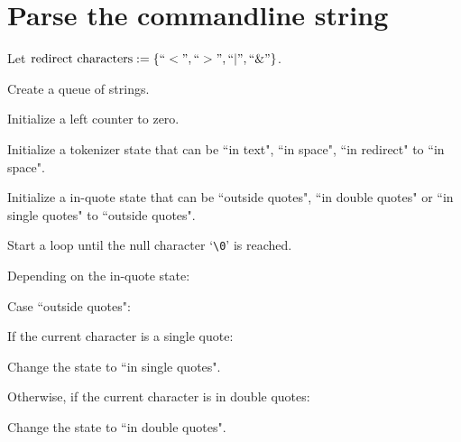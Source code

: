 \documentclass{article}
\begin{document}
\section{Parse the commandline string}
\begin{deepenum}
    \item
        Let \(\text{redirect characters} := \{``<", ``>", ``|", ``\&" \}\).
    \item
        Create a queue of strings.
    \item
        Initialize a left counter to zero.
    \item
        Initialize a tokenizer state that can be ``in text", ``in space", ``in redirect" to ``in space".
    \item
        Initialize a in-quote state that can be ``outside quotes", ``in double quotes" or ``in single quotes" to ``outside quotes".
    \item
        Start a loop until the null character `\texttt{\textbackslash0}' is reached.
        \begin{deepenum}
            \item
                Depending on the in-quote state:
                \begin{deepenum}
                    \item
                        Case ``outside quotes":
                        \begin{deepenum}
                            \item
                                If the current character is a single quote:
                                \begin{deepenum}
                                    \item
                                        Change the state to ``in single quotes".
                                \end{deepenum}
                            \item
                                Otherwise, if the current character is in double quotes:
                                \begin{deepenum}
                                    \item
                                        Change the state to ``in double quotes".
                                \end{deepenum}
                        \end{deepenum}
                    \item

\end{deepenum}
\end{deepenum}
\end{deepenum}
\end{document}
